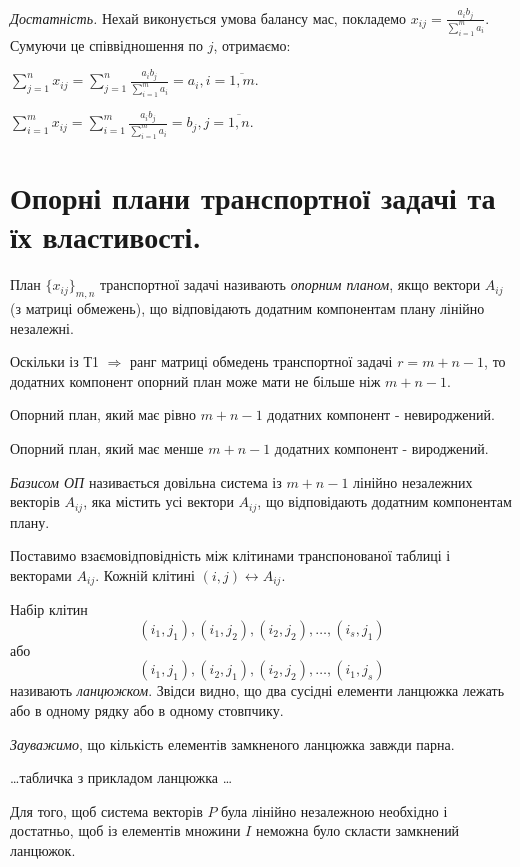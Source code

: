 \documentclass[12pt,a4paper]{article}
\newenvironment{slim_itemize}{
\begin{itemize}
  \setlength{\itemsep}{1pt}
  \setlength{\parskip}{0pt}
  \setlength{\parsep}{0pt}}
{\end{itemize}}
\begin{document}
{\it Достатність.} Нехай виконується умова балансу мас, покладемо  $x_{ij} = \frac{a_ib_j}{\sum_{i=1}^m a_i}$. Сумуючи це співвідношення по $j$, отримаємо:

$\sum_{j=1}^n x_{ij} = \sum_{j=1}^n \frac{a_ib_j}{\sum_{i=1}^m a_i} = a_i,  i = \overline{1, m}.$

$\sum_{i=1}^m x_{ij} = \sum_{i=1}^m \frac{a_ib_j}{\sum_{i=1}^m a_i} = b_j,  j = \overline{1, n}.$

\clearpage

\section{Опорні плани транспортної задачі та їх властивості.}

План $\{x_{ij}\}_{m,n}$ транспортної задачі називають \emph{опорним планом}, якщо вектори $A_{ij}$ (з матриці обмежень), що відповідають додатним компонентам плану лінійно незалежні.

Оскільки із Т1 $\Rightarrow$ ранг матриці обмедень транспортної задачі $r=m+n-1$, то додатних компонент опорний план може мати не більше ніж $m+n-1$.

\begin{slim_itemize}
  \item Опорний план, який має рівно $m+n-1$ додатних компонент - невироджений.
  \item Опорний план, який має менше $m+n-1$ додатних компонент - вироджений.
\end{slim_itemize}

\emph{Базисом ОП} називається довільна система із $m+n-1$ лінійно незалежних векторів $A_{ij}$, яка містить усі вектори $A_{ij}$, що відповідають додатним компонентам плану.

Поставимо взаємовідповідність між клітинами транспонованої таблиці і векторами $A_{ij}$. Кожній клітині $(i,j) \leftrightarrow A_{ij}$.

Набір клітин $$(i_1,j_1),(i_1,j_2),(i_2,j_2),\dots,(i_s,j_1)$$або$$(i_1,j_1),(i_2,j_1),(i_2,j_2),\dots,(i_1,j_s)$$
називають \emph{ланцюжком}. Звідси видно, що два сусідні елементи ланцюжка лежать або в одному рядку або в одному стовпчику.

\emph{Зауважимо}, що кількість елементів замкненого ланцюжка завжди парна.

\dots табличка з прикладом ланцюжка \dots

Для того, щоб система векторів $P$ була лінійно незалежною необхідно і достатньо, щоб із елементів множини $I$ неможна було скласти замкнений ланцюжок.\\
\end{document}
